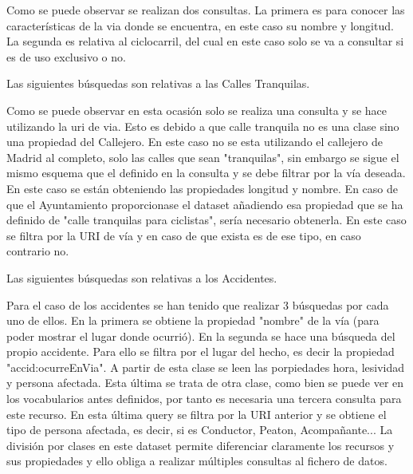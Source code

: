 Como se puede observar se realizan dos consultas. La primera es para conocer las características de la via donde se encuentra, en este caso su nombre y longitud. La segunda es relativa al ciclocarril, del cual en este caso solo se va a consultar si es de uso exclusivo o no.
\newline

Las siguientes búsquedas son relativas a las Calles Tranquilas.


Como se puede observar en esta ocasión solo se realiza una consulta y se hace utilizando la uri de via. Esto es debido a que calle tranquila no es una clase sino una propiedad del Callejero. En este caso no se esta utilizando el callejero de Madrid al completo, solo las calles que sean "tranquilas", sin embargo se sigue el mismo esquema que el definido en la consulta y se debe filtrar por la vía deseada.
En este caso se están obteniendo las propiedades longitud y nombre. En caso de que el Ayuntamiento proporcionase el dataset añadiendo esa propiedad que se ha definido de "calle tranquilas para ciclistas", sería necesario obtenerla. En este caso se filtra por la URI de vía y en caso de que exista es de ese tipo, en caso contrario no.


Las siguientes búsquedas son relativas a los Accidentes.


Para el caso de los accidentes se han tenido que realizar 3 búsquedas por cada uno de ellos. En la primera se obtiene la propiedad "nombre" de la vía (para poder mostrar el lugar donde ocurrió). En la segunda se hace una búsqueda del propio accidente. Para ello se filtra por el lugar del hecho, es decir la propiedad "accid:ocurreEnVia". A partir de esta clase se leen las porpiedades hora, lesividad y persona afectada. Esta última se trata de otra clase, como bien se puede ver en los vocabularios antes definidos, por tanto es necesaria una tercera consulta para este recurso. En esta última query se filtra por la URI anterior y se obtiene el tipo de persona afectada, es decir, si es Conductor, Peaton, Acompañante... La división por clases en este dataset permite diferenciar claramente los recursos y sus propiedades y ello obliga a realizar múltiples consultas al fichero de datos.

